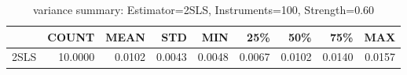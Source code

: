 \begin{table}[ht]
\centering
\caption{variance summary: Estimator=2SLS, Instruments=100, Strength=0.60}
\begin{tabular}{lrrrrrrrr}
\toprule
 & COUNT & MEAN & STD & MIN & 25\% & 50\% & 75\% & MAX \\
\midrule
2SLS & 10.0000 & 0.0102 & 0.0043 & 0.0048 & 0.0067 & 0.0102 & 0.0140 & 0.0157 \\
\bottomrule
\end{tabular}
\end{table}
